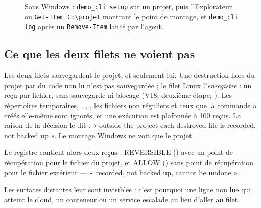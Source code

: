 \begin{figure}[htbp]
\centering
{}%
{Sous Windows : \texttt{demo\_cli setup} sur un projet, puis l'Explorateur ou \texttt{Get-Item C:\textbackslash projet} montrant le point de montage, et \texttt{demo\_cli log} après un \texttt{Remove-Item} lancé par l'agent.}
\end{figure}

\subsection{Ce que les deux filets ne voient pas}
Les deux filets sauvegardent le projet, et seulement lui. Une destruction hors du projet par du
code non lu n'est pas sauvegardée ; le filet Linux l'\emph{enregistre} : un reçu par fichier,
sans sauvegarde ni blocage (V18, deuxième étape, \commitVdixhuit). Les répertoires
temporaires, , , , les fichiers non réguliers et ceux que la
commande a créés elle-même sont ignorés, et une exécution est plafonnée à 100 reçus. La raison
de la décision le dit : « outside the project each destroyed file is recorded, not backed up ».
Le montage Windows ne voit que le projet.


Le registre contient alors deux reçus : REVERSIBLE () avec un point de
récupération pour le fichier du projet, et ALLOW () sans point de
récupération pour le fichier extérieur --- « recorded, not backed up, cannot be undone ».

Les surfaces distantes leur sont invisibles : c'est pourquoi une ligne non lue
qui atteint le cloud, un conteneur ou un service escalade au lieu d'aller au filet.
